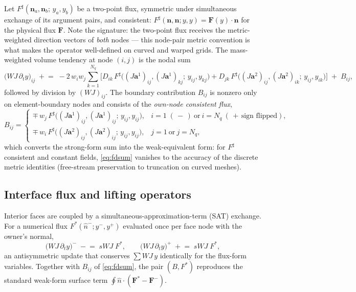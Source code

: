 \documentclass[11pt]{article}
\newcommand{\Ja}[1]{(J\boldsymbol{a}^{#1})}
\newcommand{\Fs}{F^\sharp}
\begin{document}
Let $\Fs(\boldsymbol{n}_a, \boldsymbol{n}_b;\, y_a, y_b)$ be a two-point
flux, symmetric under simultaneous exchange of its argument pairs, and
consistent: $\Fs(\boldsymbol{n},\boldsymbol{n}; y, y) =
\boldsymbol{F}(y)\cdot\boldsymbol{n}$ for the physical flux
$\boldsymbol{F}$. Note the signature: the two-point flux receives the
metric-weighted direction vectors of \emph{both} nodes --- this node-pair
metric convention is what makes the operator well-defined on curved and
warped grids. The mass-weighted volume tendency at node $(i,j)$ is the
nodal sum
\begin{equation}
\big(WJ\,\partial_t y\big)_{ij} \;+\!\!=\;
-2\,w_i w_j \sum_{k=1}^{N_q}\Big[
 D_{ik}\, \Fs\!\big(\Ja{1}_{ij}, \Ja{1}_{kj};\, y_{ij}, y_{kj}\big)
+ D_{jk}\, \Fs\!\big(\Ja{2}_{ij}, \Ja{2}_{ik};\, y_{ij}, y_{ik}\big)
\Big]
\;+\; B_{ij},
\label{eq:fdsum}
\end{equation}
followed by division by $(WJ)_{ij}$. The boundary contribution $B_{ij}$
is nonzero only on element-boundary nodes and consists of the
\emph{own-node consistent flux},
\begin{equation}
B_{ij} =
\begin{cases}
\mp\, w_j\, \Fs\big(\Ja{1}_{ij}, \Ja{1}_{ij};\, y_{ij}, y_{ij}\big),
& i = 1 \;(\,-\,)\ \text{or}\ i = N_q\ (\,+\,\text{sign flipped}),\\[2pt]
\mp\, w_i\, \Fs\big(\Ja{2}_{ij}, \Ja{2}_{ij};\, y_{ij}, y_{ij}\big),
& j = 1 \ \text{or}\ j = N_q,
\end{cases}
\end{equation}
which converts the strong-form sum into the weak-equivalent form: for
$\Fs$ consistent and constant fields, \eqref{eq:fdsum} vanishes to the
accuracy of the discrete metric identities (free-stream preservation to
truncation on curved meshes).

\subsection{Interface flux and lifting operators}

Interior faces are coupled by a simultaneous-approximation-term (SAT)
exchange. For a numerical flux $F^*(\hat n^-; y^-, y^+)$ evaluated once
per face node with the owner's normal,
\begin{equation}
\big(WJ\,\partial_t y\big)^-\; -\!\!=\; s\!W\!J \; F^*,
\qquad
\big(WJ\,\partial_t y\big)^+\; +\!\!=\; s\!W\!J\; F^*,
\label{eq:sat}
\end{equation}
an antisymmetric update that conserves $\sum WJ\, y$ identically for the
flux-form variables. Together with $B_{ij}$ of \eqref{eq:fdsum}, the pair
$(B, F^*)$ reproduces the standard weak-form surface term
$\oint \hat n \cdot (\boldsymbol{F}^* - \boldsymbol{F}^-)$.
\end{document}
